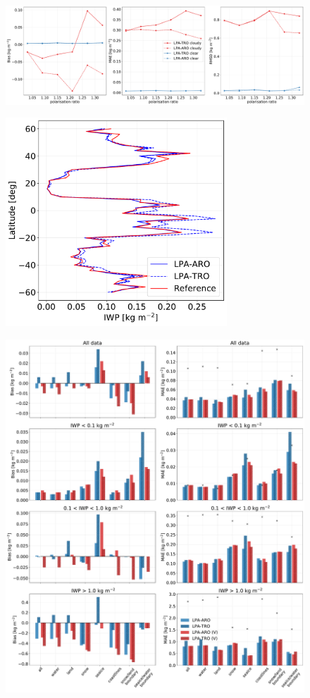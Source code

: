 \documentclass[amt, manuscript]{copernicus}
\begin{document}
\begin{figure}[t]
	\includegraphics[width=12cm]{Figures/statistics_cloudyclear_LPA.pdf}
	\caption{}
	\label{fig:clear_cloudy}
\end{figure}

\begin{figure}[t]
	\includegraphics[width=8.3cm]{Figures/zonal_mean_all_jan_testdata.pdf}
	\caption{}
	\label{fig:zonal_mean_test}
\end{figure}

\begin{figure}[t]
	\includegraphics[width=12cm]{Figures/ARO_TRO_v_vh.pdf}
	\caption{}
	\label{fig:bias_ARO_TRO}
\end{figure}
\end{document}

